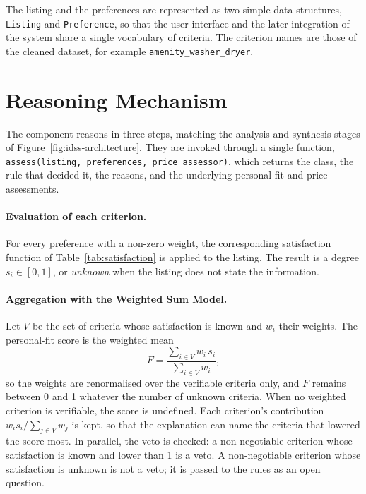 \documentclass[12pt,a4paper]{report}
\begin{document}
The listing and the preferences are represented as two simple data
structures, \texttt{Listing} and \texttt{Preference}, so that the user
interface and the later integration of the system share a single
vocabulary of criteria. The criterion names are those of the cleaned
dataset, for example \texttt{amenity\_washer\_dryer}.

\section{Reasoning Mechanism}

The component reasons in three steps, matching the analysis and synthesis
stages of Figure~\ref{fig:idss-architecture}. They are invoked through a
single function, \texttt{assess(listing, preferences, price\_assessor)},
which returns the class, the rule that decided it, the reasons, and the
underlying personal-fit and price assessments.

\paragraph{Evaluation of each criterion.} For every preference with a
non-zero weight, the corresponding satisfaction function of
Table~\ref{tab:satisfaction} is applied to the listing. The result is a
degree $s_i \in [0,1]$, or \emph{unknown} when the listing does not state
the information.

\paragraph{Aggregation with the Weighted Sum Model.} Let $V$ be the set of
criteria whose satisfaction is known and $w_i$ their weights. The
personal-fit score is the weighted mean
\begin{equation}
  F = \frac{\sum_{i \in V} w_i \, s_i}{\sum_{i \in V} w_i},
\end{equation}
so the weights are renormalised over the verifiable criteria only, and $F$
remains between 0 and 1 whatever the number of unknown criteria. When no
weighted criterion is verifiable, the score is undefined. Each criterion's
contribution $w_i s_i / \sum_{j \in V} w_j$ is kept, so that the
explanation can name the criteria that lowered the score most. In parallel,
the veto is checked: a non-negotiable criterion whose satisfaction is known
and lower than 1 is a veto. A non-negotiable criterion whose satisfaction is
unknown is not a veto; it is passed to the rules as an open question.
\end{document}
